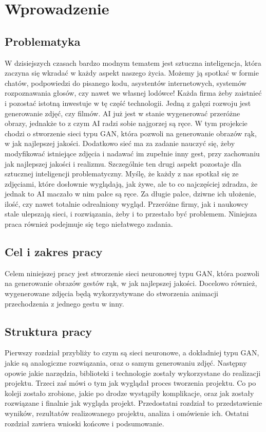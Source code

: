 \documentclass[12pt]{article}
\begin{document}
\begin{sloppypar}


\tableofcontents
\newpage

\section{Wprowadzenie}
{
  \subsection{Problematyka}
  {
    W dzisiejszych czasach bardzo modnym tematem jest sztuczna inteligencja, która zaczyna się wkradać w każdy aspekt naszego życia.
    Możemy ją spotkać w formie chatów, podpowiedzi do pisanego kodu, asystentów internetowych, systemów rozpoznawania głosów, czy nawet we własnej lodówce!
    Każda firma żeby zaistnieć i pozostać istotną inwestuje w tę część technologii. Jedną z gałęzi rozwoju jest generowanie zdjęć, czy filmów.
    AI już jest w stanie wygenerować przeróżne obrazy, jednakże to z czym AI radzi sobie najgorzej są ręce.
    \newline
    W tym projekcie chodzi o stworzenie sieci typu GAN, która pozwoli na generowanie obrazów rąk, w jak najlepszej jakości.
    Dodatkowo sieć ma za zadanie nauczyć się, żeby modyfikować istniejące zdjęcia i nadawać im zupełnie inny gest, przy zachowaniu jak najlepszej jakości i realizmu.
    Szczególnie ten drugi aspekt pozostaje dla sztucznej inteligencji problematyczny. 
    Myślę, że każdy z nas spotkał się ze zdjęciami, które dosłownie wyglądają, jak żywe, ale to co najczęściej zdradza, że jednak to AI maczało w nim palce są ręce.
    Za długie palce, dziwne ich ułożenie, ilość, czy nawet totalnie odrealniony wygląd. 
    Przeróżne firmy, jak i naukowcy stale ulepszają sieci, i rozwiązania, żeby i to przestało być problemem.
    Niniejsza praca również podejmuje się tego niełatwego zadania.
  }
  \subsection{Cel i zakres pracy}
  {
    Celem niniejszej pracy jest stworzenie sieci neuronowej typu GAN, 
    która pozwoli na generowanie obrazów gestów rąk, w jak najlepszej jakości.
    \newline
    Docelowo również, wygenerowane zdjęcia będą wykorzystywane do stworzenia animacji przechodzenia z jednego gestu w inny.
  }
  \subsection{Struktura pracy}
  {
    Pierwszy rozdział przybliży to czym są sieci neuronowe, a dokładniej typu GAN, jakie są analogiczne rozwiązania, oraz o samym generowaniu zdjęć.
    Następny opowie jakie narzędzia, biblioteki i technologie zostały wykorzystane do realizacji projektu. 
    Trzeci zaś mówi o tym jak wyglądał proces tworzenia projektu. Co po koleji zostało zrobione, jakie po drodze wystąpiły komplikacje, oraz jak zostały rozwiązane i finalnie jak wygląda projekt.
    Przedostatni rozdział to przedstawienie wyników, rezultatów realizowanego projektu, analiza i omówienie ich.
    Ostatni rozdział zawiera wnioski końcowe i podsumowanie.
  }
}


\end{sloppypar}
\end{document}
